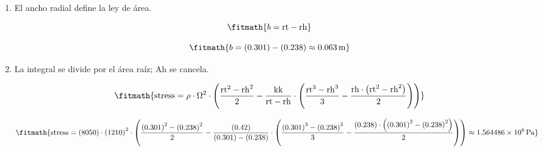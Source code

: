 \begin{enumerate}

\item El ancho radial define la ley de área.

\[\fitmath{b=\mathrm{rt}-\mathrm{rh}}\]

\[\fitmath{b=(0.301)-(0.238)\approx 0.063\,\mathrm{m}}\]

\item La integral se divide por el área raíz; Ah se cancela.

\[\fitmath{\mathrm{stress}=\rho\cdot {\Omega}^{2}\cdot \left(\frac{{\mathrm{rt}}^{2}-{\mathrm{rh}}^{2}}{2}-\frac{\mathrm{kk}}{\mathrm{rt}-\mathrm{rh}}\cdot \left(\frac{{\mathrm{rt}}^{3}-{\mathrm{rh}}^{3}}{3}-\frac{\mathrm{rh}\cdot \left({\mathrm{rt}}^{2}-{\mathrm{rh}}^{2}\right)}{2}\right)\right)}\]

\[\fitmath{\mathrm{stress}=(8050)\cdot {(1210)}^{2}\cdot \left(\frac{{(0.301)}^{2}-{(0.238)}^{2}}{2}-\frac{(0.42)}{(0.301)-(0.238)}\cdot \left(\frac{{(0.301)}^{3}-{(0.238)}^{3}}{3}-\frac{(0.238)\cdot \left({(0.301)}^{2}-{(0.238)}^{2}\right)}{2}\right)\right)\approx 1.564486\times10^{8}\,\mathrm{Pa}}\]

\end{enumerate}

